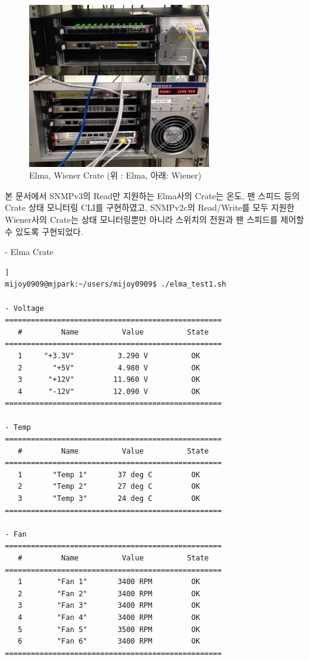 \documentclass[11pt
  , a4paper
  , article
  , oneside
]{memoir}
\begin{document}
\begin{figure}[h]
  \centering
  \includegraphics[width=0.7\textwidth]{./images/elmawiener.eps}
  \caption{Elma, Wiener Crate (위 : Elma, 아래: Wiener)}
  \label{fig:elmawiener}   
\end{figure}

\vspace{2mm}

본 문서에서 SNMPv3의 Read만 지원하는 Elma사의 Crate는 온도, 팬 스피드 등의 Crate 상태 모니터링 CLI를 구현하였고, SNMPv2c의 Read/Write를 모두 지원한 Wiener사의 Crate는 상태 모니터링뿐만 아니라 스위치의 전원과 팬 스피드를 제어할 수 있도록 구현되었다. 

\clearpage

- Elma Crate
\begin{lstlisting}[style=termstyle, caption=ELMA Crate 모니터링 결과]]
mijoy0909@mjpark:~/users/mijoy0909$ ./elma_test1.sh

- Voltage
==================================================
   #         Name          Value          State
==================================================
   1     "+3.3V"          3.290 V          OK
   2       "+5V"          4.980 V          OK
   3      "+12V"         11.960 V          OK
   4      "-12V"         12.090 V          OK
==================================================

- Temp
==================================================
   #         Name          Value          State
==================================================
   1       "Temp 1"       37 deg C         OK
   2       "Temp 2"       27 deg C         OK
   3       "Temp 3"       24 deg C         OK
==================================================

- Fan
==================================================
   #         Name          Value          State
==================================================
   1        "Fan 1"       3400 RPM         OK
   2        "Fan 2"       3400 RPM         OK
   3        "Fan 3"       3400 RPM         OK
   4        "Fan 4"       3400 RPM         OK
   5        "Fan 5"       3500 RPM         OK
   6        "Fan 6"       3400 RPM         OK
==================================================
\end{lstlisting}
\end{document}
